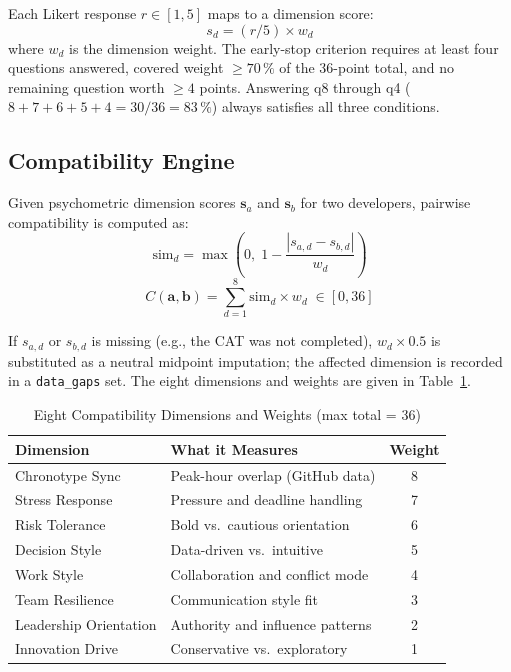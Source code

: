 \documentclass[conference]{IEEEtran}
\begin{document}
Each Likert response $r \in [1,5]$ maps to a dimension score:
\begin{equation}
  s_d = (r / 5) \times w_d
  \label{eq:likert}
\end{equation}
where $w_d$ is the dimension weight.  The early-stop criterion
requires at least four questions answered, covered weight $\geq
70\,\%$ of the 36-point total, and no remaining question worth
$\geq 4$ points.  Answering q8 through q4
($8+7+6+5+4 = 30/36 = 83\,\%$) always satisfies all three
conditions.

\subsection{Compatibility Engine}

Given psychometric dimension scores $\mathbf{s}_a$ and
$\mathbf{s}_b$ for two developers, pairwise compatibility is
computed as:
\begin{equation}
  \text{sim}_d = \max\!\left(0,\; 1 - \frac{|s_{a,d} - s_{b,d}|}{w_d}\right)
  \label{eq:sim}
\end{equation}
\begin{equation}
  C(\mathbf{a},\mathbf{b}) = \sum_{d=1}^{8} \text{sim}_d \times w_d
  \;\in [0, 36]
  \label{eq:compat}
\end{equation}

If $s_{a,d}$ or $s_{b,d}$ is missing (e.g., the CAT was not
completed), $w_d \times 0.5$ is substituted as a neutral midpoint
imputation; the affected dimension is recorded in a
\texttt{data\_gaps} set.  The eight dimensions and weights are
given in Table~\ref{tab:dims}.

\begin{table}[t]
\caption{Eight Compatibility Dimensions and Weights (max total = 36)}
\label{tab:dims}
\centering
\small
\setlength{\tabcolsep}{4pt}
\begin{tabular}{p{3.0cm}p{3.5cm}c}
\toprule
Dimension & What it Measures & Weight \\
\midrule
Chronotype Sync        & Peak-hour overlap (GitHub data)     & 8 \\
Stress Response        & Pressure and deadline handling      & 7 \\
Risk Tolerance         & Bold vs.\ cautious orientation      & 6 \\
Decision Style         & Data-driven vs.\ intuitive          & 5 \\
Work Style             & Collaboration and conflict mode     & 4 \\
Team Resilience        & Communication style fit             & 3 \\
Leadership Orientation & Authority and influence patterns    & 2 \\
Innovation Drive       & Conservative vs.\ exploratory       & 1 \\
\bottomrule
\end{tabular}
\end{table}
\end{document}
